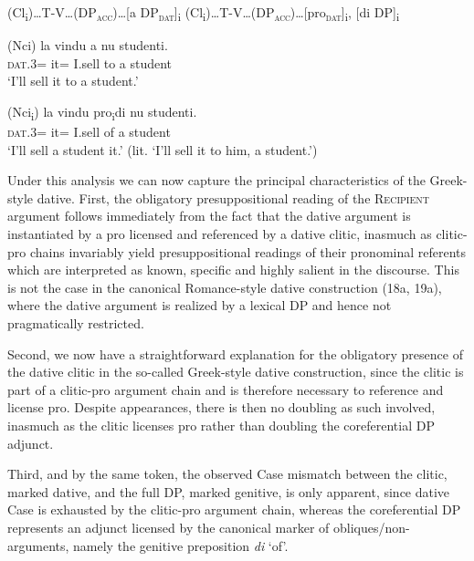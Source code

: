 \documentclass[output=paper,modfonts,nonflat]{langsci/langscibook}
\begin{document}
\ea\label{ex:ledgeway:18}
\ea  (Cl\textsubscript{i})…T-V…(DP\textsc{\textsubscript{acc}}\textsc{)}…[a  DP\textsc{\textsubscript{dat}}]\textsubscript{i}
\ex *(Cl\textsubscript{i})…T-V…(DP\textsc{\textsubscript{acc}}\textsc{)}…[pro\textsc{\textsubscript{dat}}]\textsubscript{i}, [di DP]\textsubscript{i}
\z
\z

\ea\label{ex:ledgeway:19}
\ea
	\gll (Nci)  la  vindu  a  nu  studenti.\\
    \textsc{dat}.3=  it=  I.sell  to  a  student\\
    \glt `I’ll sell it to a student.'

\ex  *(Nci\textsubscript{i})  la  vindu  pro\textsubscript{i}di  nu  studenti.\\
      \textsc{dat}.3=  it=  I.sell    of  a  student\\
    \glt `I’ll sell a student it.' (lit. `I’ll sell it to him, a student.')
    \z
    \z

Under this analysis we can now capture the principal characteristics of the Greek-style dative. First, the obligatory presuppositional reading of the \textsc{Recipient} argument follows immediately from the fact that the dative argument is instantiated by a pro licensed and referenced by a dative clitic, inasmuch as clitic-pro chains invariably yield presuppositional readings of their pronominal referents which are interpreted as known, specific and highly salient in the discourse. This is not the case in the canonical Romance-style dative construction (18a, 19a), where the dative argument is realized by a lexical DP and hence not pragmatically restricted.

Second, we now have a straightforward explanation for the obligatory presence of the dative clitic in the so-called Greek-style dative construction, since the clitic is part of a clitic-pro argument chain and is therefore necessary to reference and license pro. Despite appearances, there is then no doubling as such involved, inasmuch as the clitic licenses pro rather than doubling the coreferential DP adjunct. 

Third, and by the same token, the observed Case mismatch between the clitic, marked dative, and the full DP, marked genitive, is only apparent, since dative Case is exhausted by the clitic-pro argument chain, whereas the coreferential DP represents an adjunct licensed by the canonical marker of obliques/non-arguments, namely the genitive preposition \textit{di} ‘of’. 
\end{document}
